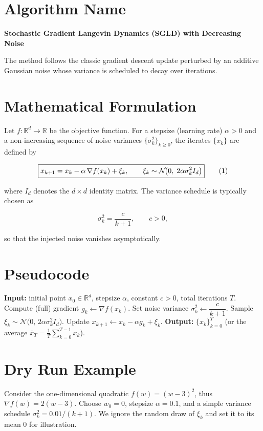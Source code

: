 \documentclass{article}
\begin{document}
\section*{Algorithm Name}
\textbf{Stochastic Gradient Langevin Dynamics (SGLD) with Decreasing Noise}  

The method follows the classic gradient descent update perturbed by an additive Gaussian noise whose variance is scheduled to decay over iterations.

\section*{Mathematical Formulation}
Let $f:\mathbb{R}^{d}\rightarrow\mathbb{R}$ be the objective function.  
For a stepsize (learning rate) $\alpha>0$ and a non‑increasing sequence of noise variances $\{\sigma_{k}^{2}\}_{k\ge 0}$, the iterates $\{x_{k}\}$ are defined by  

\[
\boxed{%
x_{k+1}=x_{k}-\alpha \,\nabla f(x_{k})+\xi_{k},
\qquad 
\xi_{k}\sim\mathcal{N}\!\bigl(0,\;2\alpha\sigma_{k}^{2} I_{d}\bigr)
}
\tag{1}
\]

where $I_{d}$ denotes the $d\times d$ identity matrix.  
The variance schedule is typically chosen as  

\[
\sigma_{k}^{2}= \frac{c}{k+1},\qquad c>0,
\tag{2}
\]

so that the injected noise vanishes asymptotically.

\section*{Pseudocode}
\begin{algorithm}[H]
\caption{SGLD with Decreasing Noise}
\begin{algorithmic}[1]
\State \textbf{Input:} initial point $x_{0}\in\mathbb{R}^{d}$, stepsize $\alpha$, constant $c>0$, total iterations $T$.
    \State Compute (full) gradient $g_{k}\gets \nabla f(x_{k})$.
    \State Set noise variance $\sigma_{k}^{2}\gets \dfrac{c}{k+1}$.
    \State Sample $\xi_{k}\sim\mathcal{N}\!\bigl(0,\,2\alpha\sigma_{k}^{2}I_{d}\bigr)$.
    \State Update $x_{k+1}\gets x_{k}-\alpha g_{k}+\xi_{k}$.
\EndFor
\State \textbf{Output:} $\{x_{k}\}_{k=0}^{T}$ (or the average $\bar{x}_{T}=\tfrac1T\sum_{k=0}^{T-1}x_{k}$).
\end{algorithmic}
\end{algorithm}

\section*{Dry Run Example}
Consider the one‑dimensional quadratic $f(w)=(w-3)^{2}$, thus $\nabla f(w)=2(w-3)$.  
Choose $w_{0}=0$, stepsize $\alpha=0.1$, and a simple variance schedule $\sigma_{k}^{2}=0.01/(k+1)$.  
We ignore the random draw of $\xi_{k}$ and set it to its mean $0$ for illustration.
\end{document}
